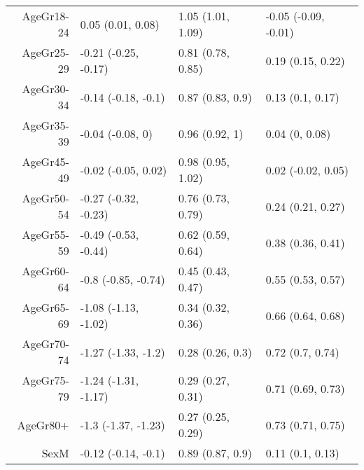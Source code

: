 \begin{table}[ht]
\begin{tabular}{rlll}
  AgeGr18-24 & 0.05 (0.01, 0.08) & 1.05 (1.01, 1.09) & -0.05 (-0.09, -0.01) \\ 
  AgeGr25-29 & -0.21 (-0.25, -0.17) & 0.81 (0.78, 0.85) & 0.19 (0.15, 0.22) \\ 
  AgeGr30-34 & -0.14 (-0.18, -0.1) & 0.87 (0.83, 0.9) & 0.13 (0.1, 0.17) \\ 
  AgeGr35-39 & -0.04 (-0.08, 0) & 0.96 (0.92, 1) & 0.04 (0, 0.08) \\ 
  AgeGr45-49 & -0.02 (-0.05, 0.02) & 0.98 (0.95, 1.02) & 0.02 (-0.02, 0.05) \\ 
  AgeGr50-54 & -0.27 (-0.32, -0.23) & 0.76 (0.73, 0.79) & 0.24 (0.21, 0.27) \\ 
  AgeGr55-59 & -0.49 (-0.53, -0.44) & 0.62 (0.59, 0.64) & 0.38 (0.36, 0.41) \\ 
  AgeGr60-64 & -0.8 (-0.85, -0.74) & 0.45 (0.43, 0.47) & 0.55 (0.53, 0.57) \\ 
  AgeGr65-69 & -1.08 (-1.13, -1.02) & 0.34 (0.32, 0.36) & 0.66 (0.64, 0.68) \\ 
  AgeGr70-74 & -1.27 (-1.33, -1.2) & 0.28 (0.26, 0.3) & 0.72 (0.7, 0.74) \\ 
  AgeGr75-79 & -1.24 (-1.31, -1.17) & 0.29 (0.27, 0.31) & 0.71 (0.69, 0.73) \\ 
  AgeGr80+ & -1.3 (-1.37, -1.23) & 0.27 (0.25, 0.29) & 0.73 (0.71, 0.75) \\ 
  SexM & -0.12 (-0.14, -0.1) & 0.89 (0.87, 0.9) & 0.11 (0.1, 0.13) \\ 
   \hline
\end{tabular}
\end{table}
